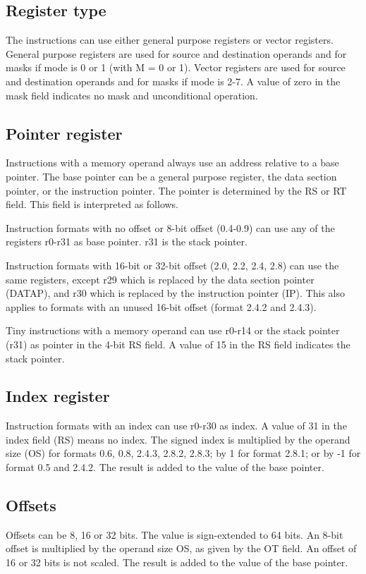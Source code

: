 \documentclass[forwardcom.tex]{subfiles}
\begin{document}
\subsection{Register type}
The instructions can use either general purpose registers or vector registers. General purpose registers are used for source and destination operands and for masks if mode is 0 or 1 (with M = 0 or 1). Vector registers are used for source and destination operands and for masks if mode is 2-7. A value of zero in the mask field indicates no mask and unconditional operation.

\subsection{Pointer register}
Instructions with a memory operand always use an address relative to a base pointer. The base pointer can be a general purpose register, the data section pointer, or the instruction pointer. The pointer is determined by the RS or RT field. This field is interpreted as follows.
\vspace{2mm}

Instruction formats with no offset or 8-bit offset (0.4-0.9) can use any of the registers r0-r31 as base pointer. r31 is the stack pointer.
\vspace{2mm}

Instruction formats with 16-bit or 32-bit offset (2.0, 2.2, 2.4, 2.8) can use the same registers, except r29 which is replaced by the data section pointer (DATAP), and r30 which is replaced by the instruction pointer (IP). This also applies to formats with an unused 16-bit offset (format 2.4.2 and 2.4.3).
\vspace{2mm}

Tiny instructions with a memory operand can use r0-r14 or the stack pointer (r31) as pointer in the 4-bit RS field. A value of 15 in the RS field indicates the stack pointer.

\subsection{Index register}
Instruction formats with an index can use r0-r30 as index. A value of 31 in the index field (RS) means no index. The signed index is multiplied by the operand size (OS) for formats 0.6, 0.8, 2.4.3, 2.8.2, 2.8.3; by 1 for format 2.8.1; or by -1 for format 0.5 and 2.4.2. The result is added to the value of the base pointer.

\subsection{Offsets}
Offsets can be 8, 16 or 32 bits. The value is sign-extended to 64 bits. An 8-bit offset is multiplied by the operand size OS, as given by the OT field. An offset of 16 or 32 bits is not scaled. The result is added to the value of the base pointer.
\vspace{2mm}
\end{document}
